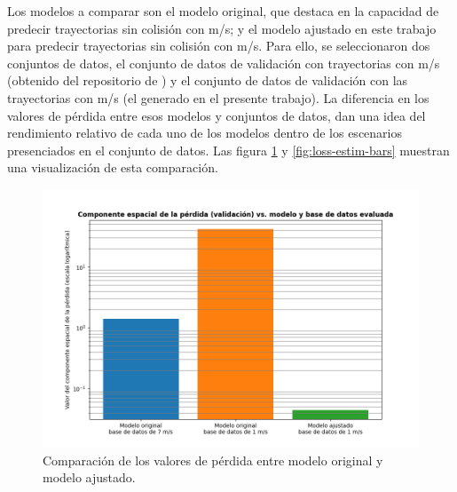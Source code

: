 Los modelos a comparar son el modelo original, que destaca en la capacidad de predecir trayectorias sin colisión con  m/s; y el modelo ajustado en este trabajo para predecir trayectorias sin colisión con  m/s. Para ello, se seleccionaron dos conjuntos de datos, el conjunto de datos de validación con trayectorias con  m/s (obtenido del repositorio de \cite{Loquercio2021}) y el conjunto de datos de validación con las trayectorias con  m/s (el generado en el presente trabajo). La diferencia en los valores de pérdida entre esos modelos y conjuntos de datos, dan una idea del rendimiento relativo de cada uno de los modelos dentro de los escenarios presenciados en el conjunto de datos. Las figura \ref{fig:loss-space-bars} y \ref{fig:loss-estim-bars} muestran una visualización de esta comparación.

\begin{figure}[H]
    \centering
    \includegraphics[scale=0.6]{partes/ImgJoao/loss-space-bars.png}
    \caption[Comparación de los valores del componente de pérdida espacial entre modelo original y modelo ajustado.]{Comparación de los valores de pérdida entre modelo original y modelo ajustado.}
    \label{fig:loss-space-bars}
\end{figure}

